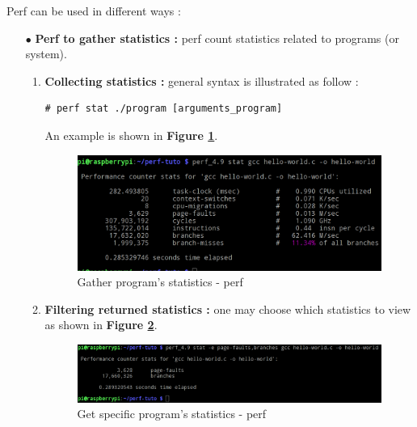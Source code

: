 \vspace{20px}
Perf can be used in different ways :
\begin{itemize}
	\item[$\bullet$] \textbf{Perf to gather statistics : } perf count statistics related to programs (or system).
	
		\begin{enumerate}
			\item \textbf{Collecting statistics : } general syntax is illustrated as follow :
	\begin{lstlisting}[style=BashInputStyle]
# perf stat ./program [arguments_program]
	\end{lstlisting}		
An example is shown in \textbf{Figure \ref{Gather program's statistics - perf}}.

					\begin{figure}[H]
						\centering
        				\includegraphics[scale=0.25]{img/solution/basic-statistics-using-perf.png}
        				\caption{Gather program's statistics - perf}
        				\label{Gather program's statistics - perf}
    				\end{figure}		
			
			
			\item \textbf{Filtering returned statistics : } one may choose which statistics to view as shown in \textbf{Figure \ref{Get specific program's statistics - perf}}.
					\begin{figure}[H]
						\centering
        				\includegraphics[scale=0.25]{img/solution/filter-statistics-using-perf.png}
        				\caption{Get specific program's statistics - perf}
        				\label{Get specific program's statistics - perf}
    				\end{figure}



\end{enumerate}
\end{itemize}
